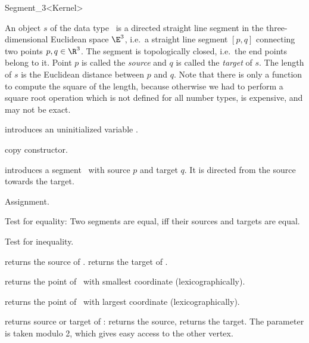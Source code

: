 \begin{ccRefClass} {Segment_3<Kernel>}


\ccDefinition  An object $s$ of the data type \ccRefName\ is a directed
straight line segment in the three-dimensional Euclidean space $\E^3$, i.e.\ a
straight line segment $[p,q]$ connecting two points $p,q \in
\R^3$. The segment is topologically closed, i.e.\  the end
points belong to it. Point $p$ is called the {\em source} and $q$
is called the {\em target} of $s$. The length of $s$ is the
Euclidean distance between $p$ and $q$. Note that there is only a function
to compute the square of the length, because otherwise we had to
perform a square root operation which is not defined for all
number types, is expensive, and may not be exact.

\ccCreation
{}


\ccHidden {}
             {introduces an uninitialized variable \ccVar.}

\ccHidden {}
 	    {copy constructor.}

            {introduces a segment \ccVar\ with source $p$
             and target $q$. It is directed from the source towards
             the target.}


\ccOperations

\ccHidden {}
        {Assignment.}

       {Test for equality: Two segments are equal, iff their sources and
        targets are equal.}

       {Test for inequality.}

       {returns the source  of \ccVar.}
\ccGlue
{}
       {returns the target of \ccVar.}

       {returns the point of \ccVar\ with smallest coordinate (lexicographically).}

       {returns the point of \ccVar\ with largest coordinate (lexicographically).}

       {returns source or target of \ccVar:    returns
        the source,  returns the target. 
        The parameter  is taken modulo 2, which gives 
        easy access to the other vertex.}


\end{ccRefClass}
